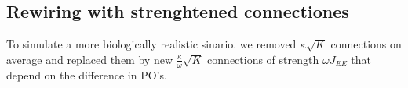 
\subsection{Rewiring with strenghtened connectiones}
To simulate a more biologically realistic sinario. we removed $\kappa \sqrt{K}$ connections on average and replaced them by new $\frac{\kappa}{\omega} \sqrt{K}$ connections of strength $\omega J_{EE}$ that depend on the difference in PO's.

